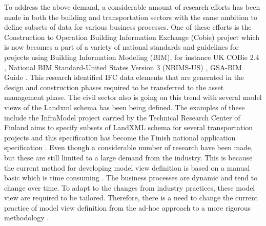 \documentclass[NewProceedings, InsideFigs]{ascelike} %
\begin{document}
To address the above demand, a considerable amount of research efforts has been made in both the building and transportation sectors with the same ambition to define subsets of data for various business processes. One of these efforts is the Construction to Operation Building Information Exchange (Cobie) project \cite{east07} which is now becomes a part of a variety of national standards and guidelines for projects using Building Information Modeling (BIM), for instance UK COBie 2.4 \cite{nisbet12}, National BIM Standard-United States Version 3 (NBIMS-US) \cite{nibs15}, GSA-BIM Guide \cite{gsa11}. This research identified IFC data elements that are generated in the design and construction phases required to be transferred to the asset management phase. The civil sector also is going on this trend with several model views of the Landxml schema has been being defined. The examples of these include the InfraModel project carried by the Technical Research Center of Finland aims to specify subsets of LandXML schema for several transportation projects and this specification has become the Finish national application specification \cite{inframodel14}. Even though a considerable number of research have been made, but these are still limited to a large demand from the industry. This is because the current method for developing model view definition is based on a manual basic which is time consuming \cite{venugopal12,eastman12,hu14}. The business processes are dynamic and tend to change over time. To adapt to the changes from industry practices, these model view are required to be tailored. Therefore, there is a need to change the current practice of model view definition from the ad-hoc approach to a more rigorous methodology \cite{venugopal12}.  %

\end{document}
